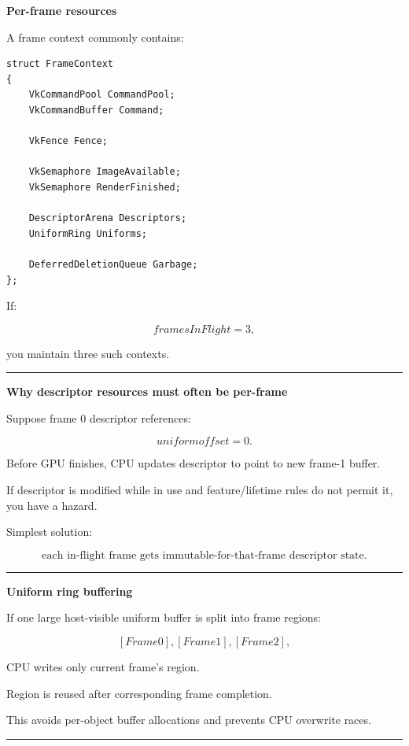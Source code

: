 \textbf{Per-frame resources}

A frame context commonly contains:

\begin{verbatim}
struct FrameContext
{
    VkCommandPool CommandPool;
    VkCommandBuffer Command;

    VkFence Fence;

    VkSemaphore ImageAvailable;
    VkSemaphore RenderFinished;

    DescriptorArena Descriptors;
    UniformRing Uniforms;

    DeferredDeletionQueue Garbage;
};
\end{verbatim}

If:

\[
framesInFlight=3,
\]

you maintain three such contexts.

\begin{center}\rule{0.5\linewidth}{0.5pt}\end{center}

\textbf{Why descriptor resources must often be per-frame}

Suppose frame 0 descriptor references:

\[
uniform offset=0.
\]

Before GPU finishes, CPU updates descriptor to point to new frame-1 buffer.

If descriptor is modified while in use and feature/lifetime rules do not permit it, you have a hazard.

Simplest solution:

\[
\boxed{
\text{each in-flight frame gets immutable-for-that-frame descriptor state}.
}
\]

\begin{center}\rule{0.5\linewidth}{0.5pt}\end{center}

\textbf{Uniform ring buffering}

If one large host-visible uniform buffer is split into frame regions:

\[
[Frame0],
[Frame1],
[Frame2],
\]

CPU writes only current frame's region.

Region is reused after corresponding frame completion.

This avoids per-object buffer allocations and prevents CPU overwrite races.

\begin{center}\rule{0.5\linewidth}{0.5pt}\end{center}

